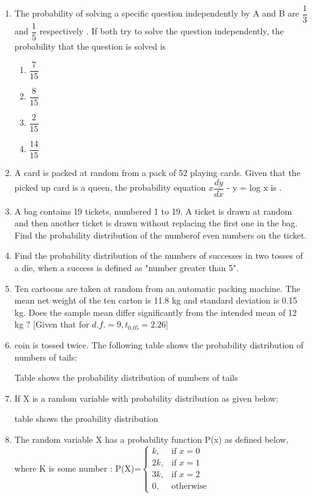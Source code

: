 \begin{enumerate}
\item The probability of solving a specific question independently by A and B are $\dfrac{1}{3}$ and $\dfrac{1}{5}$ respectively . If both try to solve the question independently, the probability that the question is solved is 
\begin{enumerate}
\item $\dfrac{7}{15}$
\item $\dfrac{8}{15}$
\item $\dfrac{2}{15}$
\item $\dfrac{14}{15}$
\end{enumerate}
\item A card is packed at random from a pack of 52 playing cards. Given that the picked up card is a queen, the probability equation $x\dfrac{dy}{dx}$ - y = log x is \underline{\hspace{1cm}}.
\item A bag contains 19 tickets, numbered 1 to 19. A ticket is drawn at random and then another ticket is drawn without replacing the first one in the bag. Find the probability distribution of the numberof even numbers on the ticket.
\item Find the probability distribution of the numbers of successes in two tosses of a die, when a success is defined as "number greater than 5".
\item Ten cartoons are taken at random from an automatic packing machine. The mean net weight of the ten carton is 11.8 kg and standard deviation is 0.15 kg. Does the sample mean differ significantly from the intended mean of 12 kg ?
[Given that for $d.f. = 9,t_0.05 = 2.26$]\\
\item coin is tossed twice. The following table shows the probability distribution of numbers of tails:
\begin{table}[!ht]
\caption{Table shows the probability distribution of numbers of tails \label{tab:Number of tails}}

\end{table}
\item If X is a random variable with probability distribution as given below:
\begin{table}[!ht]
\caption{table shows the proability distribution \label{tab: probability distribution}}

\end{table}
\item The random variable X has a probability function P(x) as defined below, where K is some number :
	P(X)=$\begin{cases} k, & \text{if }  x=0 \\ 2k, & \text{if } x=1\\ 3k, & \text{if } x=2\\ 0, & \text{otherwise  } \end{cases}$
\end{enumerate}









